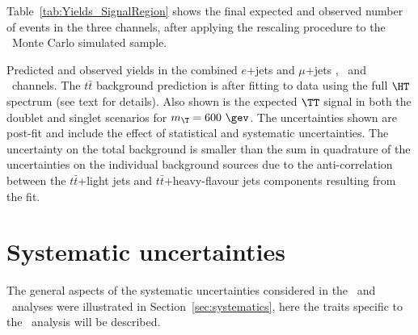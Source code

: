 Table~\ref{tab:Yields_SignalRegion} shows the final expected and
observed number of events in the three channels, after applying the rescaling
procedure to the \ttbar\ Monte Carlo simulated sample.

\begin{table}[tb]\centering

\caption{Predicted and observed yields in the combined 
$e$+jets and $\mu$+jets \chii, \chiii\ and \chiv\ channels. 
The $t\bar{t}$ background prediction is after fitting to data 
using the full $\HT$ spectrum (see text for details).
Also shown is the expected $\TT$ signal in both the doublet 
and singlet scenarios for $m_{\T}=600~\gev$. 
The uncertainties shown 
are post-fit and include the effect of 
statistical and systematic uncertainties. 
The uncertainty on the total background is smaller 
than the sum in quadrature of the uncertainties on the individual background
sources due to the anti-correlation between the $t\bar{t}$+light 
jets and $t\bar{t}$+heavy-flavour jets components resulting from 
the fit.\label{tab:Yields_SignalRegion}}
\end{table}


\section{Systematic uncertainties}\label{sec:htxSYS}

The general aspects of the systematic uncertainties considered
in the \wbx\ and \htx\ analyses were illustrated
in Section~\ref{sec:systematics}, here the traits specific to the
\htx\ analysis will be described.


